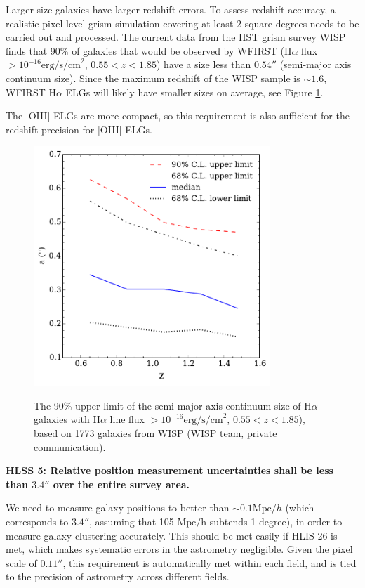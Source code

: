  Larger size galaxies have larger redshift errors. To assess redshift accuracy, a
 realistic pixel level grism simulation covering at least 2 square degrees needs
 to be carried out and processed. The current data from the HST grism survey WISP
 finds that 90\% of galaxies that would be observed by WFIRST (H$\alpha$ flux $>
 10^{-16} \mathrm{erg/s/cm}^2$, $0.55 < z < 1.85$) have a size less than $0.54''$
 (semi-major axis continuum size). Since the maximum redshift of the WISP sample
 is $\sim1.6$, WFIRST H$\alpha$ ELGs will likely have smaller sizes on average,
 see Figure \ref{fig:size_zbin}.

 The [OIII] ELGs are more compact, so this requirement is also sufficient for the
 redshift precision for [OIII] ELGs.

 \begin{figure}
 \includegraphics[width = 3.5in]{Plots/size_zbin.pdf}
 \label{fig:size_zbin}
 \caption{\footnotesize{The 90\% upper limit of the semi-major axis continuum size of H$\alpha$ galaxies
 with H$\alpha$ line flux $>10^{-16} \mathrm{erg/s/cm}^2$, $0.55 < z < 1.85$), based on 1773 galaxies from
 WISP (WISP team, private communication).
 }}
 \end{figure}



 \noindent
 {\bf HLSS 5: Relative position measurement uncertainties shall be less than $3.4''$ over
 the entire survey area. }

 We need to measure galaxy positions to better than $\sim0.1 \mathrm{Mpc}/h$ (which corresponds
 to $3.4''$, assuming that 105 $\mathrm{Mpc/h}$ subtends 1 degree), in order to measure galaxy
 clustering accurately. This should be met easily if HLIS 26 is met, which makes
 systematic errors in the astrometry negligible. Given the pixel scale of
 $0.11''$, this requirement is automatically met within each field, and is tied to the
 precision of astrometry across different fields.


